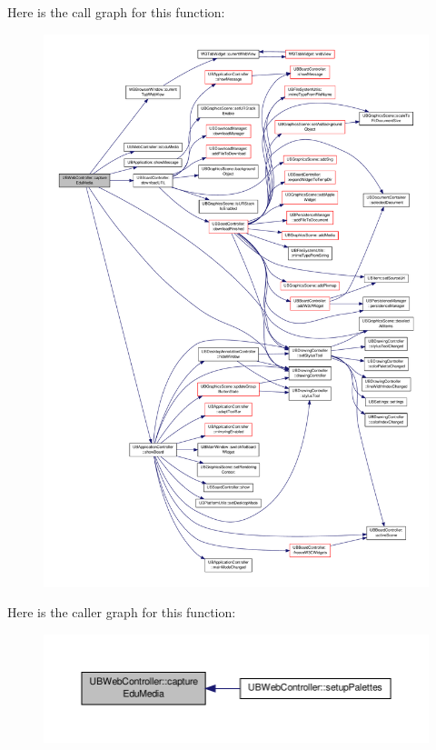 Here is the call graph for this function\-:
\nopagebreak
\begin{figure}[H]
\begin{center}
\leavevmode
\includegraphics[width=350pt]{df/d50/class_u_b_web_controller_a318422dc0a027e2258180673bb333586_cgraph}
\end{center}
\end{figure}




Here is the caller graph for this function\-:
\nopagebreak
\begin{figure}[H]
\begin{center}
\leavevmode
\includegraphics[width=350pt]{df/d50/class_u_b_web_controller_a318422dc0a027e2258180673bb333586_icgraph}
\end{center}
\end{figure}



